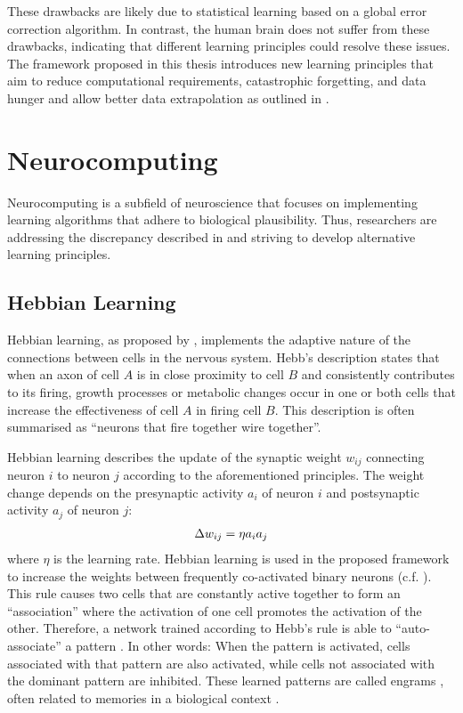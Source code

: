 These drawbacks are likely due to statistical learning based on a global error correction algorithm.
In contrast, the human brain does not suffer from these drawbacks, indicating that different learning principles could resolve these issues.
The framework proposed in this thesis introduces new learning principles that aim to reduce computational requirements, catastrophic forgetting, and data hunger and allow better data extrapolation as outlined in .


\section{Neurocomputing}
Neurocomputing is a subfield of neuroscience that focuses on implementing learning algorithms that adhere to biological plausibility. Thus, researchers are addressing the discrepancy described in  and striving to develop alternative learning principles.

\subsection{Hebbian Learning}
Hebbian learning, as proposed by , implements the adaptive nature of the connections between cells in the nervous system. Hebb's description states that when an axon of cell $A$ is in close proximity to cell $B$ and consistently contributes to its firing, growth processes or metabolic changes occur in one or both cells that increase the effectiveness of cell $A$ in firing cell $B$. This description is often summarised as ``neurons that fire together wire together''.

Hebbian learning describes the update of the synaptic weight $w_{ij}$ connecting neuron $i$ to neuron $j$ according to the aforementioned principles. The weight change depends on the presynaptic activity $a_i$ of neuron $i$ and postsynaptic activity $a_j$ of neuron $j$:
%
\begin{align}\eqlbl{hebb_1}
	\Delta w_{ij} = \eta a_i a_j
\end{align}
%
where \(\eta\) is the learning rate.
Hebbian learning is used in the proposed framework to increase the weights between frequently co-activated binary neurons (c.f. ).
This rule causes two cells that are constantly active together to form an ``association'' where the activation of one cell promotes the activation of the other.
Therefore, a network trained according to Hebb's rule is able to ``auto-associate'' a pattern \cite{hebb_organization_1949}. In other words: When the pattern is activated, cells associated with that pattern are also activated, while cells not associated with the dominant pattern are inhibited. These learned patterns are called engrams , often related to memories in a biological context .

